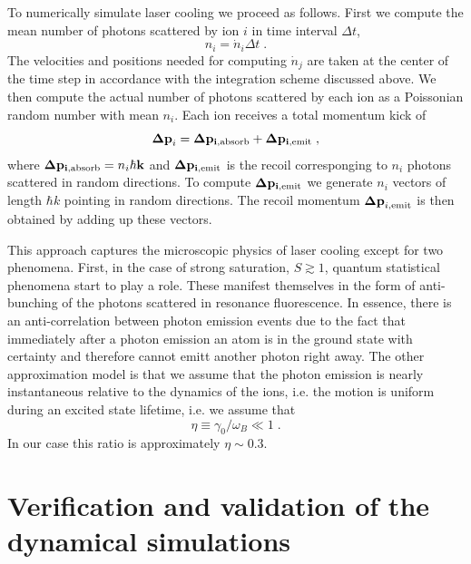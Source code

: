 \documentclass[aps, pra, twocolumn]{revtex4-1}
\begin{document}
To numerically simulate laser cooling we proceed as follows.
First we compute the mean number of photons scattered by ion $i$
in time interval $\Delta t$,
\begin{equation}
n_i=\dot{n}_i \Delta t\;.
\end{equation}
The velocities and positions needed for computing $\dot{n}_j$ are taken
at the center of the time step in accordance with the integration scheme
discussed above.  We then compute the actual number of photons scattered
by each ion as a Poissonian random number with mean $n_i$.  Each
ion receives a total momentum kick of 
\begin{equation}
\mathbf{\Delta p}_i = \mathbf{\Delta p_{i,{\rm absorb}}} + 
\mathbf{\Delta p_{i,{\rm emit}}}\;,
\end{equation}
where $\mathbf{\Delta p_{i,{\rm absorb}}}=n_i \hbar \mathbf{k}$ and
$\mathbf{\Delta p_{i,{\rm emit}}}$ is the recoil corresponging to $n_i$
photons scattered in random directions. To compute $\mathbf{\Delta
p_{i,{\rm emit}}}$ we generate $n_i$ vectors of length $\hbar k$
pointing in random directions.  The recoil momentum $\mathbf{\Delta
p}_{i,{\rm emit}}$ is then obtained by adding up these vectors.

This approach captures the microscopic physics of laser cooling
except for two phenomena. First, in the case of strong
saturation, $S\gtrsim 1$, quantum statistical phenomena start to
play a role. These manifest themselves in the form of
anti-bunching of the photons scattered in resonance fluorescence.
In essence, there is an anti-correlation between photon emission
events due to the fact that immediately after a photon emission
an atom is in the ground state with certainty and therefore
cannot emitt another photon right away. The other approximation
model is that we assume that the photon emission is nearly
instantaneous relative to the dynamics of the ions, i.e. the
motion is uniform during an excited state lifetime, i.e. we
assume that 
\begin{equation}
\eta\equiv\gamma_0/\omega_B\ll 1\;.
\end{equation}
In our case this ratio is approximately $\eta \sim 0.3$.



\section{Verification and validation of the dynamical
simulations}
\label{sec:VerificationAndValidation}
\end{document}
